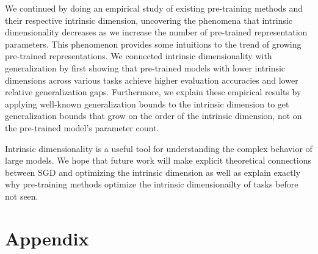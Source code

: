 \documentclass{article} \usepackage{iclr2020_conference,times}
\begin{document}
We continued by doing an empirical study of existing pre-training methods and their respective intrinsic dimension, uncovering the phenomena that intrinsic dimensionality decreases as we increase the number of pre-trained representation parameters. This phenomenon provides some intuitions to the trend of growing pre-trained representations. We connected intrinsic dimensionality with generalization by first showing that pre-trained models with lower intrinsic dimensions across various tasks achieve higher evaluation accuracies and lower relative generalization gaps. Furthermore, we explain these empirical results by applying well-known generalization bounds to the intrinsic dimension to get generalization bounds that grow on the order of the intrinsic dimension, not on the pre-trained model's parameter count.

Intrinsic dimensionality is a useful tool for understanding the complex behavior of large models. We hope that future work will make explicit theoretical connections between SGD and optimizing the intrinsic dimension as well as explain exactly why pre-training methods optimize the intrinsic dimensionailty of tasks before not seen.





\appendix
\section{Appendix}
\end{document}
